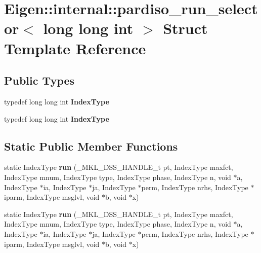 \hypertarget{struct_eigen_1_1internal_1_1pardiso__run__selector_3_01long_01long_01int_01_4}{}\section{Eigen\+:\+:internal\+:\+:pardiso\+\_\+run\+\_\+selector$<$ long long int $>$ Struct Template Reference}
\label{struct_eigen_1_1internal_1_1pardiso__run__selector_3_01long_01long_01int_01_4}
\subsection*{Public Types}
\begin{DoxyCompactItemize}
\item 
\mbox{\label{struct_eigen_1_1internal_1_1pardiso__run__selector_3_01long_01long_01int_01_4_a3d616f3f50735e26dd3900cd92f869f4}} 
typedef long long int {\bfseries Index\+Type}
\item 
\mbox{\label{struct_eigen_1_1internal_1_1pardiso__run__selector_3_01long_01long_01int_01_4_a3d616f3f50735e26dd3900cd92f869f4}} 
typedef long long int {\bfseries Index\+Type}
\end{DoxyCompactItemize}
\subsection*{Static Public Member Functions}
\begin{DoxyCompactItemize}
\item 
\mbox{\label{struct_eigen_1_1internal_1_1pardiso__run__selector_3_01long_01long_01int_01_4_a773b269fe8ba5dbb85880add63251635}} 
static Index\+Type {\bfseries run} (\+\_\+\+M\+K\+L\+\_\+\+D\+S\+S\+\_\+\+H\+A\+N\+D\+L\+E\+\_\+t pt, Index\+Type maxfct, Index\+Type mnum, Index\+Type type, Index\+Type phase, Index\+Type n, void $\ast$a, Index\+Type $\ast$ia, Index\+Type $\ast$ja, Index\+Type $\ast$perm, Index\+Type nrhs, Index\+Type $\ast$iparm, Index\+Type msglvl, void $\ast$b, void $\ast$x)
\item 
\mbox{\label{struct_eigen_1_1internal_1_1pardiso__run__selector_3_01long_01long_01int_01_4_a773b269fe8ba5dbb85880add63251635}} 
static Index\+Type {\bfseries run} (\+\_\+\+M\+K\+L\+\_\+\+D\+S\+S\+\_\+\+H\+A\+N\+D\+L\+E\+\_\+t pt, Index\+Type maxfct, Index\+Type mnum, Index\+Type type, Index\+Type phase, Index\+Type n, void $\ast$a, Index\+Type $\ast$ia, Index\+Type $\ast$ja, Index\+Type $\ast$perm, Index\+Type nrhs, Index\+Type $\ast$iparm, Index\+Type msglvl, void $\ast$b, void $\ast$x)
\end{DoxyCompactItemize}


